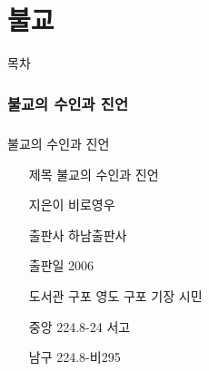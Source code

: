 \documentclass[aspectratio=1610,17pt,xcolor=pdftex,dvipsnames,table,handout]{beamer}
\begin{document}
		\begin{frame} [t,plain]
		\end{frame}			
		\begin{frame} [t,plain]
		\end{frame}			



		\part{ 불교 }
		\frame{\partpage}

		\begin{frame} [plain]{목차}
		\tableofcontents%
		\end{frame}


		\section{ 불교의 수인과 진언 }
		\begin{frame} [t,plain]
		\frametitle{}
			\begin{block} { 불교의 수인과 진언 }
			\setlength{\leftmargini}{4em}			
			\begin{itemize}
				\item [제목]  	불교의 수인과 진언 
				\item [지은이]	비로영우
				\item [출판사]	하남출판사
				\item [출판일]	2006
				\item [도서관] 	구포 영도 구포 기장 시민
				\item [중앙]		224.8-24 서고
				\item [남구]		224.8-비295
			\end{itemize}
			\end{block}						
		\end{frame}						

\end{document}
